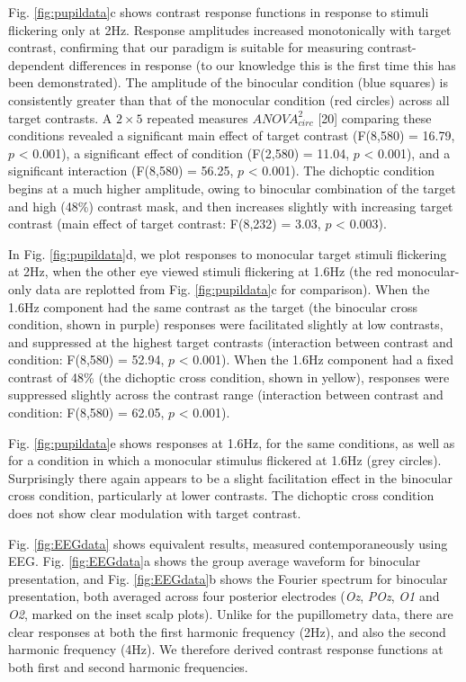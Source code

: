 \documentclass[
]{article}
\begin{document}
Fig. \ref{fig:pupildata}c shows contrast response functions in response to stimuli flickering only at 2Hz. Response amplitudes increased monotonically with target contrast, confirming that our paradigm is suitable for measuring contrast-dependent differences in response (to our knowledge this is the first time this has been demonstrated). The amplitude of the binocular condition (blue squares) is consistently greater than that of the monocular condition (red circles) across all target contrasts. A \(2\times5\) repeated measures \(ANOVA^2_{circ}\) {[}20{]} comparing these conditions revealed a significant main effect of target contrast (F(8,580) = 16.79, \(p\) \textless{} 0.001), a significant effect of condition (F(2,580) = 11.04, \(p\) \textless{} 0.001), and a significant interaction (F(8,580) = 56.25, \(p\) \textless{} 0.001). The dichoptic condition begins at a much higher amplitude, owing to binocular combination of the target and high (48\%) contrast mask, and then increases slightly with increasing target contrast (main effect of target contrast: F(8,232) = 3.03, \(p\) \textless{} 0.003).

In Fig. \ref{fig:pupildata}d, we plot responses to monocular target stimuli flickering at 2Hz, when the other eye viewed stimuli flickering at 1.6Hz (the red monocular-only data are replotted from Fig. \ref{fig:pupildata}c for comparison). When the 1.6Hz component had the same contrast as the target (the binocular cross condition, shown in purple) responses were facilitated slightly at low contrasts, and suppressed at the highest target contrasts (interaction between contrast and condition: F(8,580) = 52.94, \(p\) \textless{} 0.001). When the 1.6Hz component had a fixed contrast of 48\% (the dichoptic cross condition, shown in yellow), responses were suppressed slightly across the contrast range (interaction between contrast and condition: F(8,580) = 62.05, \(p\) \textless{} 0.001).

Fig. \ref{fig:pupildata}e shows responses at 1.6Hz, for the same conditions, as well as for a condition in which a monocular stimulus flickered at 1.6Hz (grey circles). Surprisingly there again appears to be a slight facilitation effect in the binocular cross condition, particularly at lower contrasts. The dichoptic cross condition does not show clear modulation with target contrast.

Fig. \ref{fig:EEGdata} shows equivalent results, measured contemporaneously using EEG. Fig. \ref{fig:EEGdata}a shows the group average waveform for binocular presentation, and Fig. \ref{fig:EEGdata}b shows the Fourier spectrum for binocular presentation, both averaged across four posterior electrodes (\emph{Oz}, \emph{POz}, \emph{O1} and \emph{O2}, marked on the inset scalp plots). Unlike for the pupillometry data, there are clear responses at both the first harmonic frequency (2Hz), and also the second harmonic frequency (4Hz). We therefore derived contrast response functions at both first and second harmonic frequencies.
\end{document}
